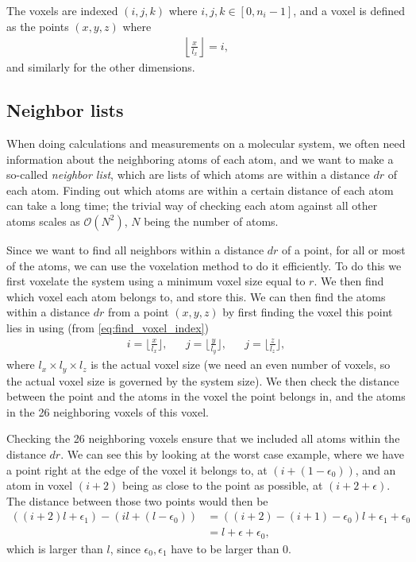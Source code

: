 The voxels are indexed $(i,j,k)$ where $i,j,k \in [0,n_i-1]$, and a voxel is defined as the points $(x,y,z)$ where
\begin{align}
    \left\lfloor\frac{x}{l_x}\right\rfloor = i,\label{eq:find_voxel_index}
\end{align}
and similarly for the other dimensions.

\subsection{Neighbor lists\label{sec:neighbor_lists}}
When doing calculations and measurements on a molecular system, we often need information about the neighboring atoms of each atom, and we want to make a so-called \emph{neighbor list}, which are lists of which atoms are within a distance $dr$ of each atom. Finding out which atoms are within a certain distance of each atom can take a long time; the trivial way of checking each atom against all other atoms scales as $\mathcal{O}(N^2)$, $N$ being the number of atoms. 
%

Since we want to find all neighbors within a distance $dr$ of a point, for all or most of the atoms, we can use the voxelation method to do it efficiently. To do this we first voxelate the system using a minimum voxel size equal to $r$. We then find which voxel each atom belongs to, and store this. We can then find the atoms within a distance $dr$ from a point $(x,y,z)$ by first finding the voxel this point lies in using (from \cref{eq:find_voxel_index})
\begin{align*}
    &i = \Bigg\lfloor \frac{x}{l_x} \Bigg\rfloor,& &j = \Bigg\lfloor \frac{y}{l_y} \Bigg\rfloor,& &j = \Bigg\lfloor \frac{z}{l_z} \Bigg\rfloor,&
\end{align*}
where $l_x\times l_y \times l_z$ is the actual voxel size (we need an even number of voxels, so the actual voxel size is governed by the system size). We then check the distance between the point and the atoms in the voxel the point belongs in, and the atoms in the 26 neighboring voxels of this voxel. 
%

Checking the 26 neighboring voxels ensure that we included all atoms within the distance $dr$. We can see this by looking at the worst case example, where we have a point right at the edge of the voxel it belongs to, at $(i+(1-\epsilon_0))$, and an atom in voxel $(i+2)$ being as close to the point as possible, at $(i+2 + \epsilon)$. The distance between those two points would then be
\begin{align*}
    ((i+2)l + \epsilon_1) - (il + (l-\epsilon_0)) 
    &= ((i + 2) - (i + 1) - \epsilon_0)l + \epsilon_1 + \epsilon_0 \\
    &= l + \epsilon + \epsilon_0,
\end{align*}
which is larger than $l$, since $\epsilon_0, \epsilon_1$ have to be larger than 0.

